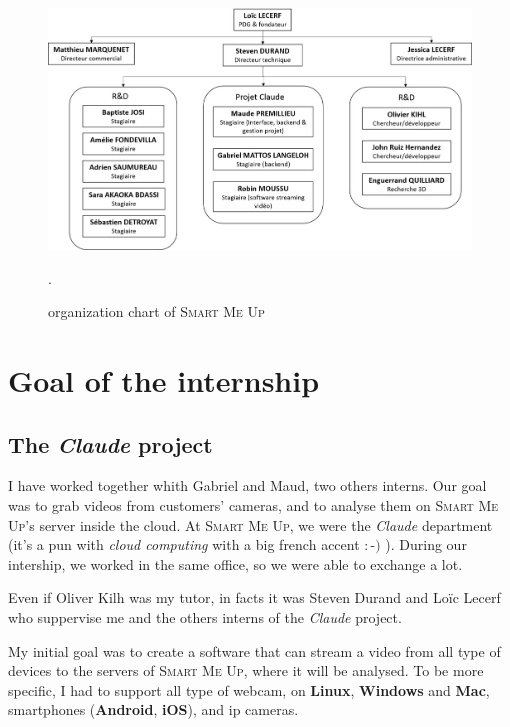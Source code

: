 \documentclass[a4paper,11pt]{custom}
\newcommand{\smu}{\textsc{Smart Me Up}}
\newcommand{\linux}{\textbf{Linux}}
\newcommand{\win}{\textbf{Windows}}
\newcommand{\mac}{\textbf{Mac}}
\newcommand{\android}{\textbf{Android}}
\newcommand{\ios}{\textbf{iOS}}
\newcommand{\claude}{\textit{Claude}}
\begin{document}
\begin{figure}
  \centering
  \def\svgwidth{\columnwidth}
  \includegraphics[width=\textwidth]{organigramme.jpg}
  \label{fig:organigramme}
  \caption{organization chart of \smu}.
\end{figure}

\chapter{Goal of the internship}

\section{The \claude{} project}

I have worked together whith Gabriel and Maud, two others interns. Our goal was
to grab videos from customers' cameras, and to analyse them on \smu's server
inside the cloud. At \smu, we were the \claude{} department (it's a pun with
\textit{cloud computing} with a big french accent $:$-$)$ ). During our
intership, we worked in the same office, so we were able to exchange a lot.

Even if Oliver Kilh was my tutor, in facts it was Steven Durand and Loïc Lecerf
who suppervise me and the others interns of the \claude{} project.

My initial goal was to create a software that can stream a video from all type of
devices to the servers of \smu, where it will be analysed. To be more specific,
I had to support all type of webcam, on \linux, \win{} and \mac, smartphones
(\android, \ios), and ip cameras.
\end{document}
